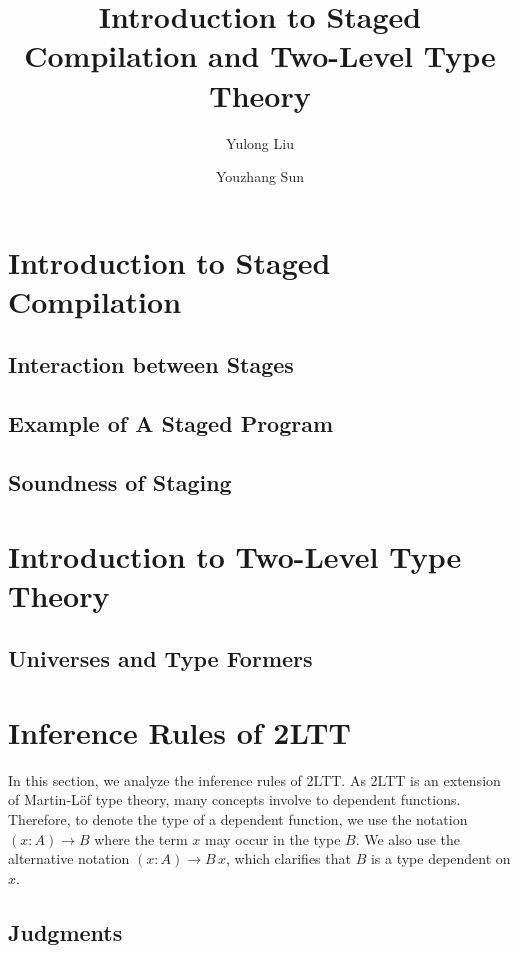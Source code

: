 \documentclass{article}
\title{Introduction to Staged Compilation and Two-Level Type Theory}
\date{}
\author{Yulong Liu\and Youzhang Sun}
\begin{document}
\maketitle

\section{Introduction to Staged Compilation}


\subsection{Interaction between Stages}


\subsection{Example of A Staged Program}\label{example-staged}


\subsection{Soundness of Staging}


\section{Introduction to Two-Level Type Theory}


\subsection{Universes and Type Formers}



\section{Inference Rules of 2LTT}

In this section, we analyze the inference rules of 2LTT. As 2LTT is an extension of Martin-Löf type theory, many concepts involve to dependent functions. Therefore, to denote the type of a dependent function, we use the notation $(x:A)\to B$ where the term $x$ may occur in the type $B$. We also use the alternative notation $(x:A)\to B\,x$, which clarifies that $B$ is a type dependent on $x$.

 
\subsection{Judgments}

\end{document}
